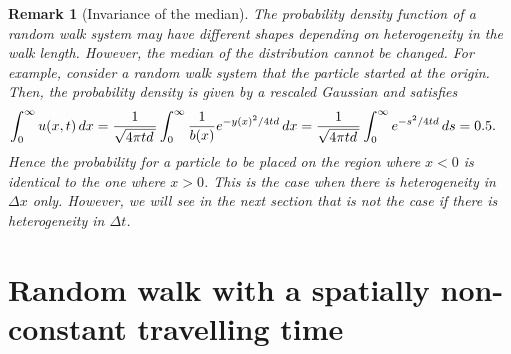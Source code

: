\documentclass[11pt]{amsart}
\def\d{d}
\newtheorem{remark}{Remark}[section]
\begin{document}
\begin{remark}[Invariance of the median]\label{Answer1}
The probability density function of a random walk system may have different shapes depending on heterogeneity in the walk length. However, the median of the distribution cannot be changed. For example, consider a random walk system that the particle started at the origin. Then, the probability density is given by a rescaled Gaussian and satisfies
\begin{equation}\label{100}
\begin{split}
\int_0^\infty u(x,t)\,dx&=\frac{1}{\sqrt{4\pi t\d\,}}\int_0^\infty {1\over b(x)}e^{-y(x)^2/4t\d}\,dx
=\frac{1}{\sqrt{4\pi t\d\,}}\int_0^\infty e^{-s^2/4t\d}\,ds=0.5.
\end{split}
\end{equation}
Hence the probability for a particle to be placed on the region where $x<0$ is identical to the one where $x>0$. This is the case when there is heterogeneity in $\Delta x$ only. However, we will see in the next section that is not the case if there is heterogeneity in $\Delta t$.
\end{remark}




\section{Random walk with a spatially non-constant travelling time}
\end{document}
